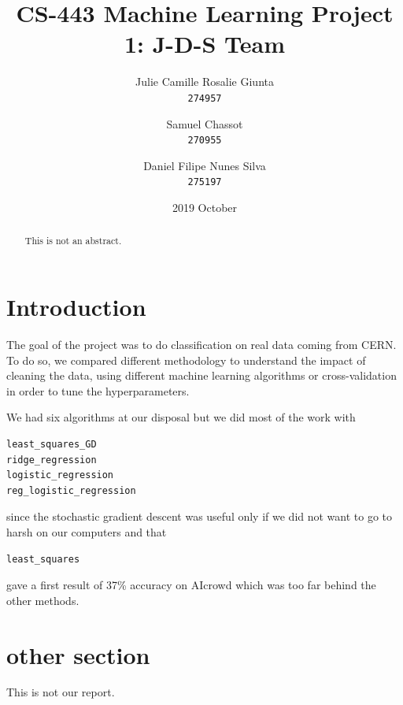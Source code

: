 \documentclass[11pt, a4paper, twoside]{article}
\begin{document}
\date{2019 October}
\title{CS-443 Machine Learning Project 1: J-D-S Team}
\author{
  Julie Camille Rosalie Giunta\\
  \texttt{274957}
  \and
  Samuel Chassot\\
  \texttt{270955}
  \and
  Daniel Filipe Nunes Silva\\
  \texttt{275197}
}

\maketitle
\clearpage

\begin{abstract}
This is not an abstract.
\end{abstract}

\section{Introduction}
The goal of the project was to do classification on real data coming from CERN. To do so, we compared different methodology to understand the impact of cleaning the data, using different machine learning algorithms or cross-validation in order to tune the hyperparameters.

We had six algorithms at our disposal but we did most of the work with 
\begin{lstlisting}
least_squares_GD 
ridge_regression
logistic_regression
reg_logistic_regression
\end{lstlisting}
since the stochastic gradient descent was useful only if we did not want to go to harsh on our computers and that
\begin{lstlisting}
least_squares
\end{lstlisting}
gave a first result of 37\% accuracy on AIcrowd which was too far behind the other methods.
 
\section{other section}
This is not our report.
\end{document}
